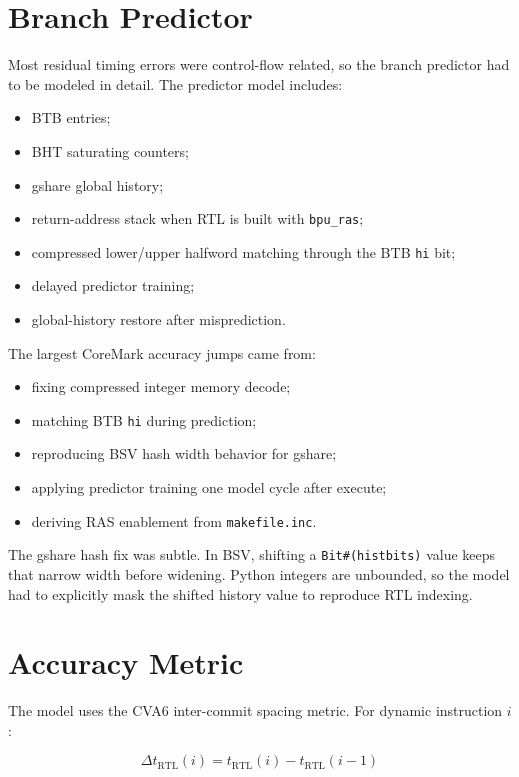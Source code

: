 \documentclass[11pt]{article}
\begin{document}
\section{Branch Predictor}

Most residual timing errors were control-flow related, so the branch predictor
had to be modeled in detail. The predictor model includes:

\begin{itemize}
  \item BTB entries;
  \item BHT saturating counters;
  \item gshare global history;
  \item return-address stack when RTL is built with \texttt{bpu\_ras};
  \item compressed lower/upper halfword matching through the BTB \texttt{hi} bit;
  \item delayed predictor training;
  \item global-history restore after misprediction.
\end{itemize}

The largest CoreMark accuracy jumps came from:

\begin{itemize}
  \item fixing compressed integer memory decode;
  \item matching BTB \texttt{hi} during prediction;
  \item reproducing BSV hash width behavior for gshare;
  \item applying predictor training one model cycle after execute;
  \item deriving RAS enablement from \texttt{makefile.inc}.
\end{itemize}

The gshare hash fix was subtle. In BSV, shifting a \texttt{Bit\#(histbits)}
value keeps that narrow width before widening. Python integers are unbounded, so
the model had to explicitly mask the shifted history value to reproduce RTL
indexing.

\section{Accuracy Metric}

The model uses the CVA6 inter-commit spacing metric. For dynamic instruction
\(i\):

\[
\Delta t_{\mathrm{RTL}}(i) = t_{\mathrm{RTL}}(i) - t_{\mathrm{RTL}}(i-1)
\]
\end{document}
